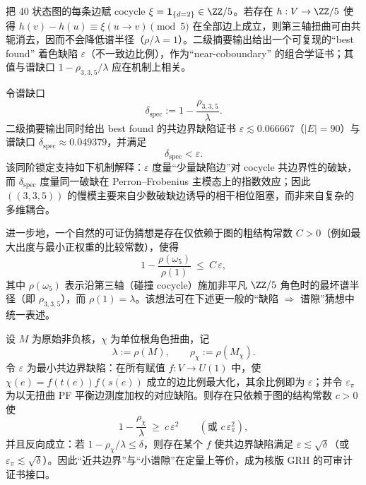 \begin{remark}\label{rem:arity-335-best-5-coloring}
把 40 状态图的每条边赋 cocycle $\xi=\mathbf{1}_{\{d=2\}}\in\ZZ/5$。若存在 $h:V\to\ZZ/5$ 使得 $h(v)-h(u)\equiv \xi(u\to v)\pmod 5$ 在全部边上成立，则第三轴扭曲可由共轭消去，因而不会降低谱半径（$\rho/\lambda=1$）。二级摘要输出给出一个可复现的“best found” 着色缺陷 $\varepsilon$（不一致边比例），作为“near-coboundary” 的组合学证书；其值与谱缺口 $1-\rho_{3,3,5}/\lambda$ 应在机制上相关。
\end{remark}

\begin{remark}[近共边界缺陷的组合测度与谱测度同阶]\label{rem:arity-335-eps-vs-gap}
令谱缺口
$$
\delta_{\mathrm{spec}}:=1-\frac{\rho_{3,3,5}}{\lambda}.
$$
二级摘要输出同时给出 best found 的共边界缺陷证书 \(\varepsilon\lesssim 0.066667\)（\(|E|=90\)）与谱缺口
\(
\delta_{\mathrm{spec}}\approx 0.049379
\)，并满足
$$
\delta_{\mathrm{spec}}<\varepsilon.
$$
该同阶锁定支持如下机制解释：\(\varepsilon\) 度量“少量缺陷边”对 cocycle 共边界性的破缺，而 \(\delta_{\mathrm{spec}}\) 度量同一破缺在 Perron--Frobenius 主模态上的指数效应；因此 \(((3,3,5))\) 的慢模主要来自少数破缺边诱导的相干相位阻塞，而非来自复杂的多维耦合。

进一步地，一个自然的可证伪猜想是存在仅依赖于图的粗结构常数 \(C>0\)（例如最大出度与最小正权重的比较常数），使得
$$
1-\frac{\rho(\omega_5)}{\rho(1)}\ \le\ C\,\varepsilon,
$$
其中 \(\rho(\omega_5)\) 表示沿第三轴（碰撞 cocycle）施加非平凡 \(\ZZ/5\) 角色时的最坏谱半径（即 \(\rho_{3,3,5}\)），而 \(\rho(1)=\lambda\)。该想法可在下述更一般的“缺陷 $\Rightarrow$ 谱隙”猜想中统一表述。
\end{remark}



\begin{conjecture}\label{conj:coboundary-defect-gap}
设 $M$ 为原始非负核，$\chi$ 为单位根角色扭曲，记
$$
\lambda:=\rho(M),\qquad \rho_\chi:=\rho(M_\chi).
$$
令 \(\varepsilon\) 为最小共边界缺陷：在所有赋值 \(f:V\to U(1)\) 中，使
\(
\chi(e)=f(t(e))\overline{f(s(e))}
\)
成立的边比例最大化，其余比例即为 \(\varepsilon\)；并令 \(\varepsilon_\pi\) 为以无扭曲 PF 平衡边测度加权的对应缺陷。则存在只依赖于图的结构常数 \(c>0\) 使
$$
1-\frac{\rho_\chi}{\lambda}\ \ge\ c\,\varepsilon^2
\qquad(\text{或 }c\,\varepsilon_\pi^2),
$$
并且反向成立：若 \(1-\rho_\chi/\lambda\le \delta\)，则存在某个 \(f\) 使共边界缺陷满足 \(\varepsilon\lesssim \sqrt{\delta}\)（或 \(\varepsilon_\pi\lesssim \sqrt{\delta}\)）。因此“近共边界”与“小谱隙”在定量上等价，成为核版 GRH 的可审计证书接口。
\end{conjecture}

